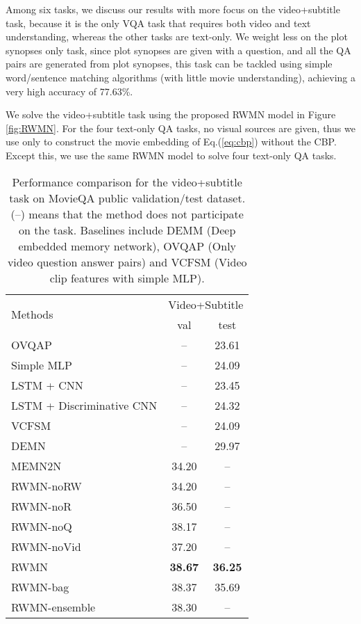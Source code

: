 \documentclass[10pt,twocolumn,letterpaper]{article}
\theoremstyle{nonumberplain}
\begin{document}
Among six tasks, we discuss our results with more focus on the video+subtitle task, because it is the only VQA task that requires both video and text understanding, whereas the other tasks are text-only. 
We weight less on the plot synopses only task, since plot synopses are given with a question, and all the QA pairs are generated from plot synopses, this task can be tackled using simple word/sentence matching algorithms (with little movie understanding), achieving a very high accuracy of 77.63\%. 

We solve the video+subtitle task using the proposed RWMN model in Figure \ref{fig:RWMN}.
For the four text-only QA tasks, no visual sources  are given, 
thus we use  only to construct the movie embedding  of Eq.(\ref{eq:cbp}) without the CBP.
Except this, we use the same RWMN model to solve four text-only QA tasks. 

\begin{table}
\centering
\small
\newcommand{\ranked}[1]{\xspace\scriptsize\sf{(#1)}}
\begin{tabular}{l|cc}
\hline
\multirow{2}{*}{Methods} & \multicolumn{2}{c}{Video+Subtitle} \\
& val & test \\
\hline
OVQAP & -- & 23.61 \\
Simple MLP & -- & 24.09 \\
LSTM + CNN & -- & 23.45 \\
LSTM + Discriminative CNN & -- & 24.32\\

VCFSM & -- & 24.09  \\
DEMN~\cite{kim2017deepstory} & -- & 29.97 \\
MEMN2N~\cite{tapaswi2016movieqa} & 34.20 & -- \\
\hline
RWMN-noRW & 34.20 & --  \\
RWMN-noR & 36.50 & -- \\
RWMN-noQ & 38.17 & -- \\
RWMN-noVid & 37.20 & -- \\
RWMN & \textbf{38.67} & \textbf{36.25} \\
RWMN-bag & 38.37 & 35.69 \\
RWMN-ensemble & 38.30 & -- \\
\hline
\end{tabular}
\vspace{6pt}
\caption{Performance comparison for the video+subtitle task on MovieQA public validation/test dataset.
(--) means that the method does not participate on the task. 
Baselines include DEMM (Deep embedded memory network), OVQAP (Only video question answer pairs) and VCFSM (Video clip features with simple MLP).}
\vspace{-5pt}
\label{tab:results_video}
\end{table}
\end{document}
